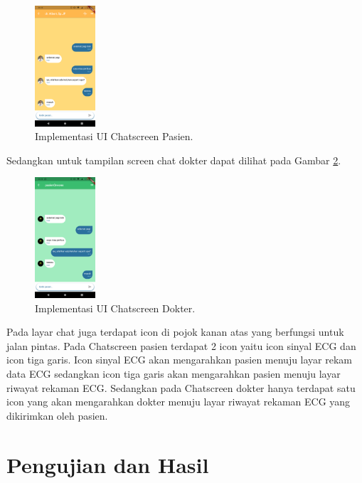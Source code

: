 \documentclass[conference]{IEEEtran}
\begin{document}
	\begin{figure}[h] \centering
		\includegraphics[width=0.2\textwidth]{img/layar_chatpasien.png}
		\caption{Implementasi UI Chatscreen Pasien.}
		\label{fig:3.10}
	\end{figure}
	
	Sedangkan untuk tampilan screen chat dokter dapat dilihat pada Gambar \ref{fig:3.11}.
	
	\begin{figure}[h] \centering
		\includegraphics[width=0.2\textwidth]{img/layar_chatdokter.png}
		\caption{Implementasi UI Chatscreen Dokter.}
		\label{fig:3.11}
	\end{figure}
	
	Pada layar chat juga terdapat icon di pojok kanan atas yang berfungsi untuk jalan pintas. Pada Chatscreen pasien terdapat 2 icon yaitu icon sinyal ECG dan icon tiga garis. Icon sinyal ECG akan mengarahkan pasien menuju layar rekam data ECG sedangkan icon tiga garis akan mengarahkan pasien menuju layar riwayat rekaman ECG.
	Sedangkan pada Chatscreen dokter hanya terdapat satu icon yang akan mengarahkan dokter menuju layar riwayat rekaman ECG yang dikirimkan oleh pasien. 
	\vspace{1ex}
	
	
	\section{Pengujian dan Hasil}
\end{document}
